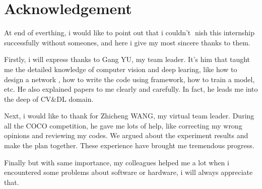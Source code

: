 \chapter{Acknowledgement}

At end of everthing, i would like to point out that i couldn’t nish this internship
successfully without someones, and here i give my most sincere thanks to them.

Firstly, i will express thanks to Gang YU, my team leader. It’s him
that taught me the detailed knowledge of computer vision and deep learing, like how to design a network , how to write the code using framework, how to train a model, etc.
He also explained papers to me clearly and carefully.
In fact, he leads me into the deep of CV&DL domain.

Next, i would like to thank for Zhicheng WANG, my virtual team leader.
During all the COCO competition, he gave me lots of help, like correcting my wrong opinions and reviewing my codes.
We argued about the experiment results and make the plan together.
These experience have brought me tremendous progress.

Finally but with same importance, my colleagues helped me a lot when i encountered
some problems about software or hardware, i will always appreciate that.

